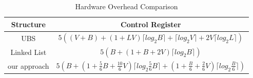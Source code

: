 \documentclass[10pt,conference]{IEEEtran}
\begin{document}

\begin{table}
\centering\begin{tabular}{c|c}
\hline
\hline
Structure & Control Register\\
\hline
UBS\cite{NPKV06}  &   $5((V+B)+(1+LV)\lceil log_2B\rceil+\lceil log_2V\rceil+2V\lceil log_2L\rceil)$\\
\hline
Linked List\cite{4555894} & $5(B+(1+B+2V) \lceil log_2B\rceil)$\\
\hline
our approach    & $5(B+(1+\frac{5}{6}B+\frac{10}{6}V)\lceil log_2\frac{5}{6}B\rceil +(1+\frac{B}{6}+\frac{2}{6}V)\lceil log_2\frac{B}{6}\rceil)$\\
\hline
\end{tabular}
\caption{Hardware Overhead Comparison}\label{control}
\end{table}
\end{document}
